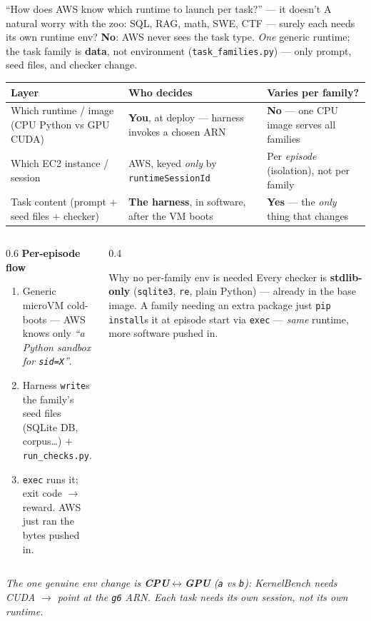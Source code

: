 \documentclass[aspectratio=169]{beamer}
\begin{document}
\begin{frame}{``How does AWS know which runtime to launch per task?'' --- it doesn't}
  \footnotesize A natural worry with the zoo: SQL, RAG, math, SWE, CTF --- surely each needs its own
  runtime env? \textbf{No}: AWS never sees the task type. \emph{One} generic runtime; the task family is
  \textbf{data}, not environment (\texttt{task\_families.py}) --- only prompt, seed files, and checker change.
  \begin{center}
  \renewcommand{\arraystretch}{0.5}\scriptsize
  \begin{tabular}{@{}p{3.6cm}p{4.2cm}p{4.0cm}@{}}
    \toprule
    \textbf{Layer} & \textbf{Who decides} & \textbf{Varies per family?} \\
    \midrule
    Which runtime / image (CPU Python vs GPU CUDA) & \textbf{You}, at deploy --- harness invokes a chosen ARN & \textbf{No} --- one CPU image serves all families \\
    Which EC2 instance / session & AWS, keyed \emph{only} by \texttt{runtimeSessionId} & Per \emph{episode} (isolation), not per family \\
    Task content (prompt $+$ seed files $+$ checker) & \textbf{The harness}, in software, after the VM boots & \textbf{Yes} --- the \emph{only} thing that changes \\
    \bottomrule
  \end{tabular}
  \end{center}
  \vspace{-0.5em}
  \begin{columns}[T]
    \begin{column}{0.6\textwidth}
      \scriptsize\textbf{Per-episode flow}
      \begin{enumerate}\setlength\itemsep{0.02em}
        \item[\textbf{1}] Generic microVM cold-boots --- AWS knows only \emph{``a Python sandbox for \texttt{sid=X}''}.
        \item[\textbf{2}] Harness \texttt{write}s the family's seed files (SQLite DB, corpus\ldots) $+$ \texttt{run\_checks.py}.
        \item[\textbf{3}] \texttt{exec} runs it; exit code $\to$ reward. AWS just ran the bytes pushed in.
      \end{enumerate}
    \end{column}
    \begin{column}{0.4\textwidth}
      \begin{block}{Why no per-family env is needed}
        \scriptsize Every checker is \textbf{stdlib-only} (\texttt{sqlite3}, \texttt{re}, plain Python) ---
        already in the base image. A family needing an extra package just \texttt{pip install}s it at
        episode start via \texttt{exec} --- \emph{same} runtime, more software pushed in.
      \end{block}
    \end{column}
  \end{columns}
  {\scriptsize\itshape The one genuine env change is \textbf{CPU$\leftrightarrow$GPU} (\texttt{a} vs
  \texttt{b}): KernelBench needs CUDA $\to$ point at the \texttt{g6} ARN. Each task needs its own
  \emph{session}, not its own \emph{runtime}.}
\end{frame}
\end{document}

